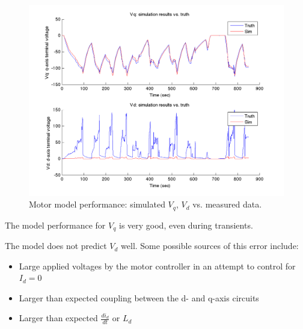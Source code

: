\documentclass[../SimBALink.tex]{subfiles}
\begin{document}
		\begin{figure}[h]
			\centering
			\includegraphics[width=\linewidth]{../Model/Powertrain/Motor/Validation/EMRAX_228HV/Figures/Vq_Vd}
			\caption{Motor model performance: simulated $V_q$, $V_d$ vs. measured data.}
		\end{figure}
		\FloatBarrier
		
		The model performance for $V_q$ is very good, even during transients. 
		
		The model does not predict $V_d$ well. Some possible sources of this error include:
		
		\begin{itemize}
			\item		Large applied voltages by the motor controller in an attempt to control for $I_d = 0$
			\item		Larger than expected coupling between the d- and q-axis circuits
			\item		Larger than expected $\frac{d i_d}{d t}$ or $L_d$
		\end{itemize}
		
		
\end{document}
